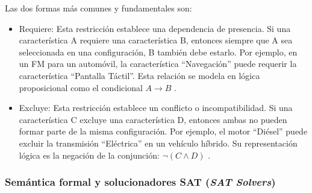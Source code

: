 Las dos formas más comunes y fundamentales son:
\begin{itemize}
    \item Requiere: Esta restricción establece una dependencia de presencia. Si
    una característica A requiere una característica B, entonces siempre que
    A sea seleccionada en una configuración, B también debe estarlo. Por ejemplo, en 
    un \ac{FM} para un automóvil, la
    característica ``Navegación'' puede requerir la característica ``Pantalla
    Táctil''. Esta relación se modela en lógica proposicional como el
    condicional $A \rightarrow B$ \citep{sundermann2023sat, benavides2005Taxonomy}.
    \item Excluye: Esta restricción establece un conflicto o incompatibilidad. Si
    una característica C excluye una característica D, entonces ambas no
    pueden formar parte de la misma configuración. Por ejemplo, el motor
    ``Diésel'' puede excluir la transmisión ``Eléctrica'' en un vehículo híbrido.
    Su representación lógica es la negación de la conjunción: $\neg(C \land D)$
    \citep{sundermann2023sat, benavides2005Taxonomy}.
\end{itemize}

\subsubsection{Semántica formal y solucionadores SAT (\textit{SAT Solvers})}

